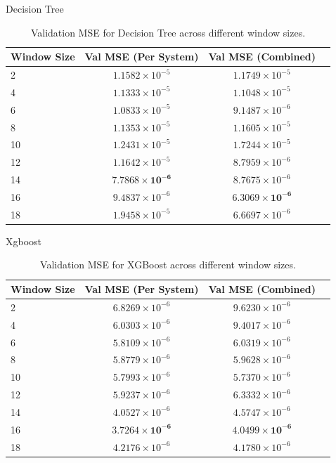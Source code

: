 \documentclass[aspectratio=169]{beamer}
\begin{document}
\begin{frame}{Decision Tree}

\begin{table}[h]
\centering
\begin{tabular}{|l|c|c|c|}
\hline
\textbf{Window Size} & \textbf{Val MSE (Per System)} & \textbf{Val MSE (Combined)} \\
\hline
2  & $1.1582 \times 10^{-5}$ & $1.1749 \times 10^{-5}$ \\
4  & $1.1333 \times 10^{-5}$ & $1.1048 \times 10^{-5}$ \\
6  & $1.0833 \times 10^{-5}$ & $9.1487 \times 10^{-6}$ \\
8  & $1.1353 \times 10^{-5}$ & $1.1605 \times 10^{-5}$ \\
10 & $1.2431 \times 10^{-5}$ & $1.7244 \times 10^{-5}$ \\
12 & $1.1642 \times 10^{-5}$ & $8.7959 \times 10^{-6}$ \\
14 & $\mathbf{7.7868 \times 10^{-6}}$ & $8.7675 \times 10^{-6}$ \\
16 & $9.4837 \times 10^{-6}$ &  $\mathbf{6.3069 \times 10^{-6}}$ \\
18 & $1.9458 \times 10^{-5}$ & $6.6697 \times 10^{-6}$ \\
\hline
\end{tabular}
\caption{Validation MSE for Decision Tree across different window sizes.}
\label{tab:dt_val_mse}
\end{table}

\end{frame}

\begin{frame}{Xgboost}
\begin{table}[h]
\centering
\begin{tabular}{|l|c|c|c|}
\hline
\textbf{Window Size} & \textbf{Val MSE (Per System)} & \textbf{Val MSE (Combined)} \\
\hline
2  & $6.8269 \times 10^{-6}$ & $9.6230 \times 10^{-6}$ \\
4  & $6.0303 \times 10^{-6}$ & $9.4017 \times 10^{-6}$ \\
6  & $5.8109 \times 10^{-6}$ & $6.0319 \times 10^{-6}$ \\
8  & $5.8779 \times 10^{-6}$ & $5.9628 \times 10^{-6}$ \\
10 & $5.7993 \times 10^{-6}$ & $5.7370 \times 10^{-6}$ \\
12 & $5.9237 \times 10^{-6}$ & $6.3332 \times 10^{-6}$ \\
14 & $4.0527 \times 10^{-6}$ & $4.5747 \times 10^{-6}$ \\
16 & $\mathbf{3.7264 \times 10^{-6}}$ & $\mathbf{4.0499 \times 10^{-6}}$ \\
18 & $4.2176 \times 10^{-6}$ & $4.1780 \times 10^{-6}$ \\
\hline
\end{tabular}
\caption{Validation MSE for XGBoost across different window sizes.}
\label{tab:xgb_val_mse}
\end{table}
\end{frame}
\end{document}
